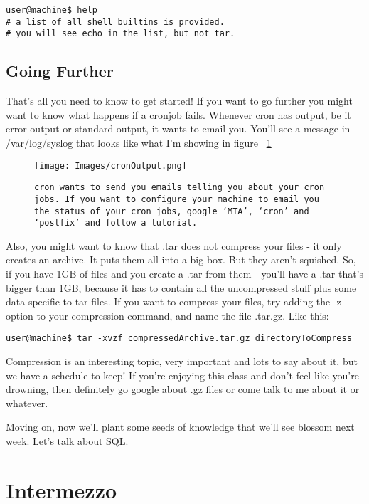 \documentclass[12pt,a4paper]{article}
\begin{document}
\begin{lstlisting}[style=term]
user@machine$ help
# a list of all shell builtins is provided. 
# you will see echo in the list, but not tar.
\end{lstlisting}

\subsection{Going Further}
That's all you need to know to get started! If you want to go further you might
want to know what happens if a cronjob fails. Whenever cron has output, be it
error output or standard output, it wants to email you. You'll see a message in
/var/log/syslog that looks like what I'm showing in figure ~\ref{fig:mta}

\begin{figure}[h]
\centering
	\texttt{[image: Images/cronOutput.png]}
	\caption{{\small \texttt{cron wants to send you emails telling you about your cron jobs. If
you want to configure your machine to email you the status of your cron jobs,
google `MTA', `cron' and `postfix' and follow a tutorial.}}}
	\label{fig:mta}
\end{figure}

Also, you might want to know that .tar does not compress your files - it only
creates an archive. It puts them all into a big box. But they aren't squished.
So, if you have 1GB of files and you create a .tar from them - you'll have a
.tar that's bigger than 1GB, because it has to contain all the uncompressed
stuff plus some data specific to tar files. If you want to compress your files,
try adding the -z option to your compression command, and name the file .tar.gz.
Like this:

\begin{lstlisting}[style=term]
user@machine$ tar -xvzf compressedArchive.tar.gz directoryToCompress
\end{lstlisting}

Compression is an interesting topic, very important and lots to say about it,
but we have a schedule to keep! If you're enjoying this class and don't feel
like you're drowning, then definitely go google about .gz files or come talk to
me about it or whatever.

Moving on, now we'll plant some seeds of knowledge that we'll see blossom next
week. Let's talk about SQL.

\section{Intermezzo}
\end{document}
